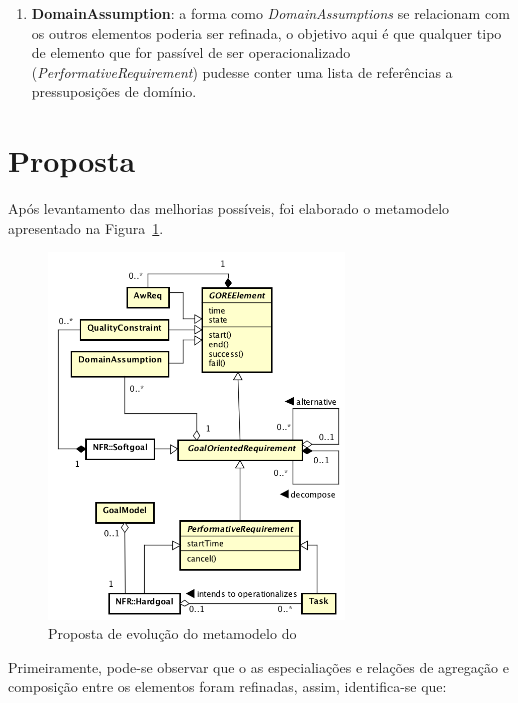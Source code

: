 \begin{enumerate}
	\item \textbf{DomainAssumption}: a forma como \textit{DomainAssumptions} se relacionam com os outros elementos poderia ser refinada, o objetivo aqui é que qualquer tipo de elemento que for passível de ser operacionalizado (\textit{PerformativeRequirement}) pudesse conter uma lista de referências a pressuposições de domínio. \label{p6}
\end{enumerate}

\section{Proposta}
\label{sec-zanshin-proposta}

Após levantamento das melhorias possíveis, foi elaborado o metamodelo apresentado na Figura~\ref{figura-metamodelo-novo}. 

\begin{figure}[h]
	\centering
	\includegraphics[width=0.7\textwidth]{figuras/metamodelos/metamodelo-zanshin-novo.png}
	\caption{Proposta de evolução do metamodelo do \framework \zanshin}
	\label{figura-metamodelo-novo}
\end{figure}

Primeiramente, pode-se observar que o as especialiações e relações de agregação e composição entre os elementos foram refinadas, assim, identifica-se que:

